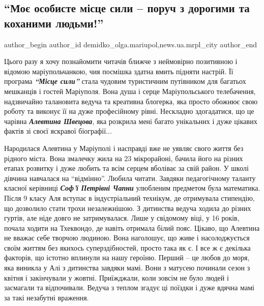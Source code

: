  
 
 
 
 
 
\subsection{\enquote{Моє особисте місце сили – поруч з дорогими та коханими людьми!}}
\label{sec:31_08_2021.stz.news.ua.mrpl_city.1.alevtina_shvecova}
 
\ifcmt
 author_begin
   author_id demidko_olga.mariupol,news.ua.mrpl_city
 author_end
\fi


Цього разу я хочу познайомити читачів ближче з неймовірно позитивною і відомою
маріупольчанкою, чия посмішка здатна вмить підняти настрій. Її програма \emph{\textbf{\enquote{Місце
сили}}} стала чудовим туристичним путівником для багатьох мешканців і гостей
Маріуполя. Вона душа і серце Маріупольського телебачення, надзвичайно
талановита ведуча та креативна блогерка, яка просто обожнює свою роботу та
виконує її на дуже  професійному рівні. Нескладно здогадатися, що це чарівна
\emph{\textbf{Алевтина Швецова}}, яка розкрила мені багато унікальних і дуже цікавих фактів зі
своєї яскравої біографії...


Народилася Алевтина у Маріуполі і насправді вже не уявляє свого життя без
рідного міста. Вона змалечку жила  на 23 мікрорайоні, бачила його на різних
етапах розвитку і дуже любить та всім серцем вболіває за свій район. У школі
дівчина навчалася на \enquote{відмінно}. Любила  читати. Завдяки педагогічному таланту
класної керівниці \emph{\textbf{Соф'ї Петрівні Чапни}} улюбленим предметом була математика.
Після 9 класу Аля вступає в індустріальний технікум, де отримувала стипендію,
що дозволило стати трохи незалежнішою.  З дитинства ведуча ходила до різних
гуртів, але ніде довго не затримувалася. Лише у свідомому віці, у 16 років,
почала ходити на Тхеквондо, де навіть отримала білий пояс.  Цікаво, що Алевтина
не вважає себе творчою людиною. Вона наголошує, що живе і насолоджується  своїм
життям без якихось суперздібностей, просто така як є. І все ж є декілька
факторів, що істотно  вплинули на нашу героїню. Перший – це любов до моря, яка
виникла у Алі з дитинства завдяки мамі. Вони з матусею починали  сезон  з
квітня і закінчували у жовтні. Приїжджали, коли зовсім не було людей і
засмагали та відпочивали. Ведуча з теплом згадує ці поїздки і дуже вдячна мамі
за такі незабутні враження.

